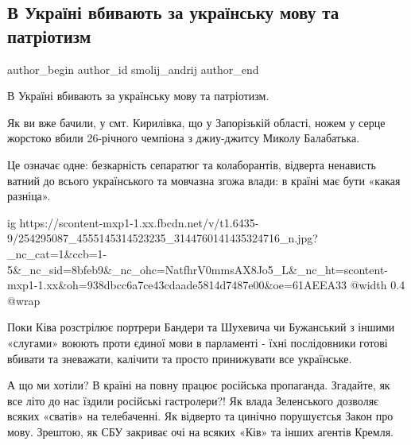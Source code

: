  
 
 
 
 
 
\subsection{В Україні вбивають за українську мову та патріотизм}
\label{sec:07_11_2021.fb.smolij_andrij.1.balabatjko_ubijstvo_mova}
 
\ifcmt
 author_begin
   author_id smolij_andrij
 author_end
\fi

В Україні вбивають за українську мову та патріотизм. 

Як ви вже бачили, у смт. Кирилівка, що у Запорізькій області, ножем у серце
жорстоко вбили 26-річного чемпіона з джиу-джитсу Миколу Балабатька. 

Це означає одне: безкарність сепаратюг та колаборантів, відверта ненависть
ватний до всього українського та мовчазна згожа влади: в країні має бути «какая
разніца». 

\ifcmt
  ig https://scontent-mxp1-1.xx.fbcdn.net/v/t1.6435-9/254295087_4555145314523235_3144760141435324716_n.jpg?_nc_cat=1&ccb=1-5&_nc_sid=8bfeb9&_nc_ohc=NatfhrV0mmsAX8Jo5_L&_nc_ht=scontent-mxp1-1.xx&oh=938dbcc6a7ce43cdaade5814d7487e00&oe=61AEEA33
  @width 0.4
  @wrap 
\fi

Поки Ківа розстрілює портрери Бандери та Шухевича чи Бужанський з іншими
«слугами» воюють проти єдиної мови в парламенті - їхні послідовники готові
вбивати та зневажати, калічити та просто принижувати все українське.

А що ми хотіли? В країні на повну працює російська пропаганда. Згадайте, як все
літо до нас їздили російські гастролери?! Як влада Зеленського дозволяє всяких
«сватів» на телебаченні. Як відверто та цинічно порушуєтсья Закон про мову.
Зрештою, як СБУ закриває очі на всяких «Ків» та інших агентів Кремля.

